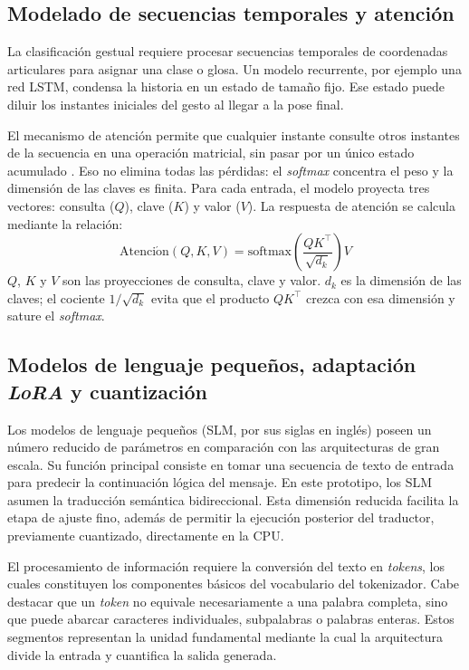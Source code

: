 \subsection{Modelado de secuencias temporales y atención}
La clasificación gestual requiere procesar secuencias temporales de coordenadas articulares para asignar una clase o glosa. Un modelo recurrente, por ejemplo una red LSTM, condensa la historia en un estado de tamaño fijo. Ese estado puede diluir los instantes iniciales del gesto al llegar a la pose final.

El mecanismo de atención permite que cualquier instante consulte otros instantes de la secuencia en una operación matricial, sin pasar por un único estado acumulado \parencite{vaswani2017attention}. Eso no elimina todas las pérdidas: el \textit{softmax} concentra el peso y la dimensión de las claves es finita. Para cada entrada, el modelo proyecta tres vectores: consulta ($Q$), clave ($K$) y valor ($V$). La respuesta de atención se calcula mediante la relación:
\begin{equation}
\mathrm{Atenci\acute{o}n}(Q, K, V) = \mathrm{softmax}\!\left(\frac{QK^{\top}}{\sqrt{d_k}}\right) V
\label{eq:atencion}
\end{equation}
$Q$, $K$ y $V$ son las proyecciones de consulta, clave y valor. $d_k$ es la dimensión de las claves; el cociente $1/\sqrt{d_k}$ evita que el producto $QK^{\top}$ crezca con esa dimensión y sature el \textit{softmax}.


\subsection{Modelos de lenguaje pequeños, adaptación \textit{LoRA} y cuantización}
Los modelos de lenguaje pequeños (SLM, por sus siglas en inglés) poseen un número reducido de parámetros en comparación con las arquitecturas de gran escala. Su función principal consiste en tomar una secuencia de texto de entrada para predecir la continuación lógica del mensaje. En este prototipo, los SLM asumen la traducción semántica bidireccional. Esta dimensión reducida facilita la etapa de ajuste fino, además de permitir la ejecución posterior del traductor, previamente cuantizado, directamente en la CPU.

El procesamiento de información requiere la conversión del texto en \textit{tokens}, los cuales constituyen los componentes básicos del vocabulario del tokenizador. Cabe destacar que un \textit{token} no equivale necesariamente a una palabra completa, sino que puede abarcar caracteres individuales, subpalabras o palabras enteras. Estos segmentos representan la unidad fundamental mediante la cual la arquitectura divide la entrada y cuantifica la salida generada.
\label{sec:token}

